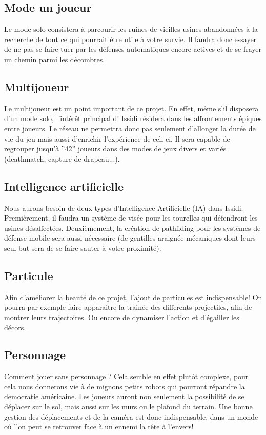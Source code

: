 ﻿\documentclass[12pt]{article}
\begin{document}
\subsection{Mode un joueur}
Le mode solo consistera à parcourir les ruines de vieilles usines abandonnées à la recherche
de tout ce qui pourrait être utile à votre survie. Il faudra donc essayer de ne pas se faire
tuer par les défenses automatiques encore actives et de se frayer un chemin parmi les décombres.

\subsection{Multijoueur}
Le multijoueur est un point important de ce projet.
En effet, même s’il disposera d’un mode solo, l’intérêt principal d’ Issidi résidera dans les
affrontements épiques entre joueurs. Le réseau ne permettra donc pas seulement d’allonger
la durée de vie du jeu mais aussi d’enrichir l’expérience de celi-ci. Il sera capable
de regrouper jusqu’à ”42” joueurs dans des modes de jeux divers et variés (deathmatch, capture de drapeau...).

\subsection{Intelligence artificielle}
Nous aurons besoin de deux types d’Intelligence Artiﬁcielle (IA) dans Issidi.
Premièrement, il faudra un système de visée pour les tourelles qui défendront
les usines désaffectées. Deuxièmement, la création de pathﬁding pour les systèmes
de défense mobile sera aussi nécessaire (de gentilles araignée mécaniques dont leurs
seul but sera de se faire sauter à votre proximité).

\subsection{Particule}
Aﬁn d’améliorer la beauté de ce projet, l’ajout de particules est indispensable!
On pourra par exemple faire apparaitre la trainée des differents projectiles, aﬁn de
montrer leurs trajectoires. Ou encore de dynamiser l’action et d’égailler les décors.

\subsection{Personnage}
Comment jouer sans personnage ? Cela semble en effet plutôt complexe, pour cela
nous donnerons vie à de mignons petits robots qui pourront répandre la democratie
américaine. Les joueurs auront non seulement la possibilité de se déplacer sur le sol,
mais aussi sur les murs ou le plafond du terrain. Une bonne gestion des déplacements
et de la caméra est donc indispensable, dans un monde où l’on peut se retrouver face
à un ennemi la tête à l’envers!
\end{document}
